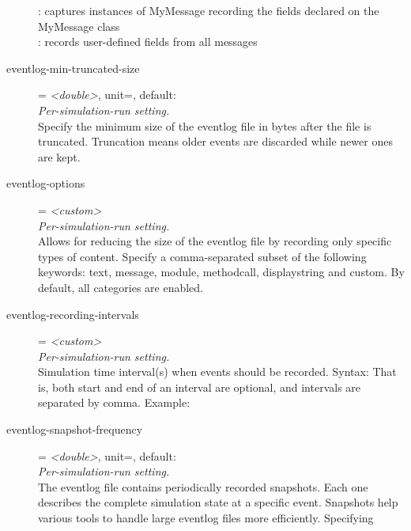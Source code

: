 \begin{description}
    :
    captures instances of MyMessage recording the fields declared on the
    MyMessage class\\
      : records
    user-defined fields from all messages
\item[eventlog-min-truncated-size] = \textit{<double>}, unit=, default: \\
    \textit{Per-simulation-run setting.}\\
    Specify the minimum size of the eventlog file in bytes after the file is
    truncated. Truncation means older events are discarded while newer ones are
    kept.
\item[eventlog-options] = \textit{<custom>}\\
    \textit{Per-simulation-run setting.}\\
    Allows for reducing the size of the eventlog file by recording only
    specific types of content. Specify a comma-separated subset of the
    following keywords: text, message, module, methodcall, displaystring and
    custom. By default, all categories are enabled.
\item[eventlog-recording-intervals] = \textit{<custom>}\\
    \textit{Per-simulation-run setting.}\\
    Simulation time interval(s) when events should be recorded. Syntax:
     That is,
    both start and end of an interval are optional, and intervals are separated
    by comma. Example: 
\item[eventlog-snapshot-frequency] = \textit{<double>}, unit=, default: \\
    \textit{Per-simulation-run setting.}\\
    The eventlog file contains periodically recorded snapshots. Each one
    describes the complete simulation state at a specific event. Snapshots help
    various tools to handle large eventlog files more efficiently. Specifying

\end{description}
